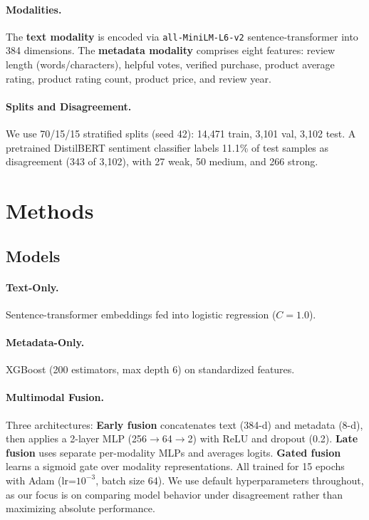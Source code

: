 \documentclass[11pt,a4paper]{article}
\begin{document}
\paragraph{Modalities.}
The \textbf{text modality} is encoded via \texttt{all-MiniLM-L6-v2} sentence-transformer \citep{reimers2019sentence} into 384 dimensions.
The \textbf{metadata modality} comprises eight features: review length (words/characters), helpful votes, verified purchase, product average rating, product rating count, product price, and review year.

\paragraph{Splits and Disagreement.}
We use 70/15/15 stratified splits (seed 42): 14{,}471 train, 3{,}101 val, 3{,}102 test.
A pretrained DistilBERT sentiment classifier labels 11.1\% of test samples as disagreement (343 of 3{,}102), with 27 weak, 50 medium, and 266 strong.

\section{Methods}

\subsection{Models}

\paragraph{Text-Only.}
Sentence-transformer embeddings fed into logistic regression ($C=1.0$).

\paragraph{Metadata-Only.}
XGBoost (200 estimators, max depth 6) on standardized features.

\paragraph{Multimodal Fusion.}
Three architectures:
\textbf{Early fusion} concatenates text (384-d) and metadata (8-d), then applies a 2-layer MLP (256$\to$64$\to$2) with ReLU and dropout (0.2).
\textbf{Late fusion} uses separate per-modality MLPs and averages logits.
\textbf{Gated fusion} learns a sigmoid gate over modality representations.
All trained for 15 epochs with Adam (lr=$10^{-3}$, batch size 64).
We use default hyperparameters throughout, as our focus is on comparing model behavior under disagreement rather than maximizing absolute performance.
\end{document}
